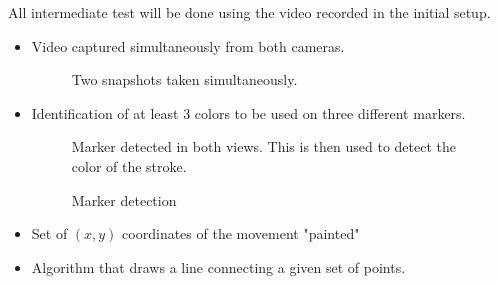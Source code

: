\documentclass[a4paper,12pt]{article}
\begin{document}
All intermediate test will be done using the video recorded in the initial setup. 
\begin{itemize}
\item Video captured simultaneously from both cameras. 
\begin{figure}[H]
    \begin{center}
	\caption{Two snapshots taken simultaneously.}

	\label{fig:board}
    \end{center}
\end{figure}

\item Identification of at least 3 colors to be used on three different markers.
\begin{figure}[H]
    \begin{center}
	\caption{Marker detection}
    Marker detected in both views. This is then used to detect the color of the stroke.
	\label{fig:board}
    \end{center}
\end{figure}
\item Set of $(x,y)$ coordinates of the movement "painted"
\item Algorithm that draws a line connecting a given set of points.
\end{itemize}
\end{document}
